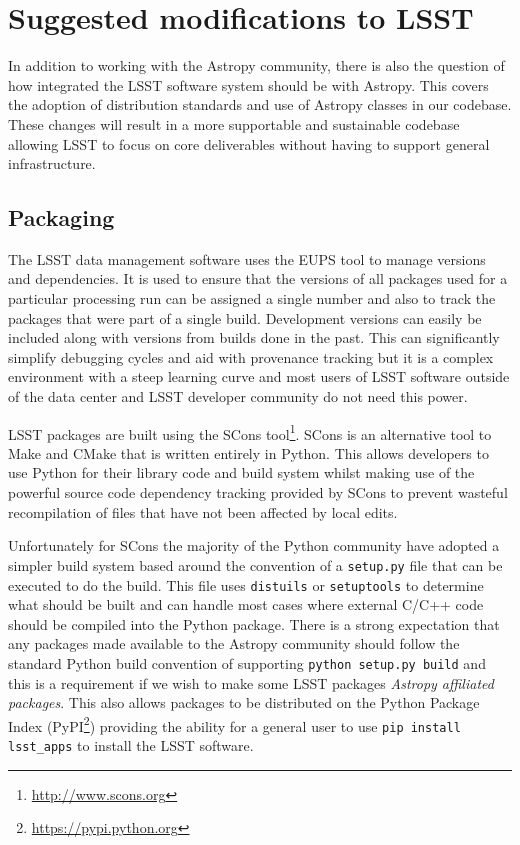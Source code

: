 \documentclass[]{spie}  %
\begin{document}
\section{Suggested modifications to LSST}

In addition to working with the Astropy community, there is also the question of how integrated the LSST software system should be with Astropy.
This covers the adoption of distribution standards and use of Astropy classes in our codebase.
These changes will result in a more supportable and sustainable codebase allowing LSST to focus on core deliverables without having to support general infrastructure.

\subsection{Packaging}

The LSST data management software uses the EUPS tool\cite{EUPS} to manage versions and dependencies.
It is used to ensure that the versions of all packages used for a particular processing run can be assigned a single number and also to track the packages that were part of a single build.
Development versions can easily be included along with versions from builds done in the past.
This can significantly simplify debugging cycles and aid with provenance tracking but it is a complex environment with a steep learning curve and most users of LSST software outside of the data center and LSST developer community do not need this power.

LSST packages are built using the SCons tool\footnote{\url{http://www.scons.org}}\cite{2005Scons1377085}.
SCons is an alternative tool to Make and CMake that is written entirely in Python.
This allows developers to use Python for their library code and build system whilst making use of the powerful source code dependency tracking provided by SCons to prevent wasteful recompilation of files that have not been affected by local edits.

Unfortunately for SCons the majority of the Python community have adopted a simpler build system based around the convention of a \texttt{setup.py} file that can be executed to do the build.
This file uses \texttt{distuils} or \texttt{setuptools} to determine what should be built and can handle most cases where external C/C++ code should be compiled into the Python package.
There is a strong expectation that any packages made available to the Astropy community should follow the standard Python build convention of supporting \texttt{python setup.py build} and this is a requirement if we wish to make some LSST packages \emph{Astropy affiliated packages}.
This also allows packages to be distributed on the Python Package Index (PyPI\footnote{\url{https://pypi.python.org}}) providing the ability for a general user to use \texttt{pip install lsst\_apps} to install the LSST software.
\end{document}
